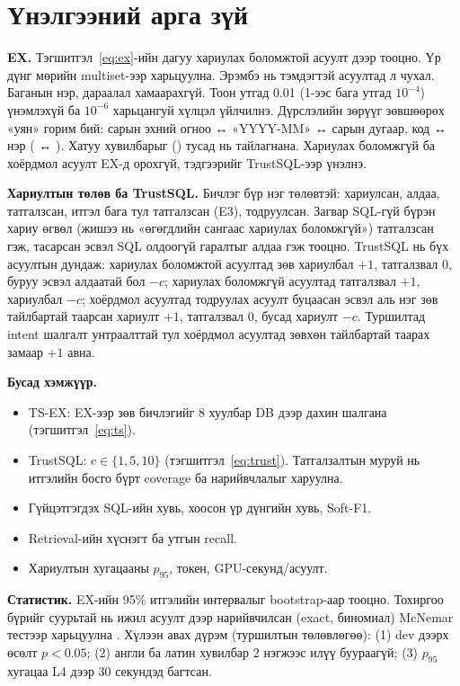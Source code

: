 \section{Үнэлгээний арга зүй}
\label{sec:eval-method}

\textbf{EX.} Тэгшитгэл~\ref{eq:ex}-ийн дагуу хариулах боломжтой асуулт дээр тооцно. Үр дүнг мөрийн multiset-ээр
харьцуулна. Эрэмбэ нь  тэмдэгтэй асуултад л чухал. Баганын нэр, дараалал
хамаарахгүй. Тоон утгад 0.01 (1-ээс бага утгад $10^{-4}$) үнэмлэхүй ба $10^{-6}$ харьцангуй хүлцэл үйлчилнэ.
Дүрслэлийн зөрүүг зөвшөөрөх «уян» горим бий: сарын эхний огноо ↔ «YYYY-MM» ↔ сарын дугаар, код ↔ нэр
( ↔ ). Хатуу хувилбарыг () тусад нь тайлагнана. Хариулах
боломжгүй ба хоёрдмол асуулт EX-д орохгүй, тэдгээрийг TrustSQL-ээр үнэлнэ.

\textbf{Хариултын төлөв ба TrustSQL.} Бичлэг бүр нэг төлөвтэй: хариулсан, алдаа, татгалзсан, итгэл бага тул татгалзсан
(E3), тодруулсан. Загвар SQL-гүй бүрэн хариу өгвөл (жишээ нь «өгөгдлийн сангаас хариулах боломжгүй») татгалзсан гэж,
тасарсан эсвэл SQL олдоогүй гаралтыг алдаа гэж тооцно. TrustSQL нь бүх асуултын дундаж: хариулах боломжтой асуултад
зөв хариулбал $+1$, татгалзвал $0$, буруу эсвэл алдаатай бол $-c$; хариулах боломжгүй асуултад татгалзвал $+1$,
хариулбал $-c$; хоёрдмол асуултад тодруулах асуулт буцаасан эсвэл аль нэг зөв тайлбартай таарсан хариулт $+1$,
татгалзвал $0$, бусад хариулт $-c$. Туршилтад intent шалгалт унтраалттай тул хоёрдмол асуултад зөвхөн тайлбартай
таарах замаар $+1$ авна.

\textbf{Бусад хэмжүүр.}
\begin{itemize}
  \item TS-EX: EX-ээр зөв бичлэгийг 8 хуулбар DB дээр дахин шалгана (тэгшитгэл~\ref{eq:ts}).
  \item TrustSQL: $c \in \{1, 5, 10\}$ (тэгшитгэл~\ref{eq:trust}). Татгалзалтын муруй нь итгэлийн босго бүрт coverage ба нарийвчлалыг харуулна.
  \item Гүйцэтгэгдэх SQL-ийн хувь, хоосон үр дүнгийн хувь, Soft-F1.
  \item Retrieval-ийн хүснэгт ба утгын recall.
  \item Хариултын хугацааны $p_{95}$, токен, GPU-секунд/асуулт.
\end{itemize}

\textbf{Статистик.} EX-ийн 95\% итгэлийн интервалыг bootstrap-аар тооцно. Тохиргоо бүрийг суурьтай нь ижил асуулт дээр
нарийвчилсан (exact, биномиал) McNemar тестээр харьцуулна \cite{mcnemar_1947}. Хүлээн авах дүрэм (туршилтын төлөвлөгөө):
(1) dev дээрх өсөлт $p < 0.05$;
(2) англи ба латин хувилбар 2 нэгжээс илүү буураагүй;
(3) $p_{95}$ хугацаа L4 дээр 30 секундэд багтсан.

